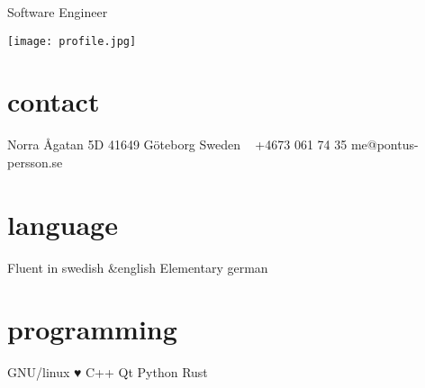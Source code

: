 \documentclass[]{friggeri-cv}
\begin{document}
       {Software Engineer}


\begin{aside}
	\texttt{[image: profile.jpg]}
  \section{contact}
    Norra Ågatan 5D
    41649 Göteborg
    Sweden
    ~
    +4673 061 74 35
    me@pontus-\nobreak persson.se
  \section{language}
	Fluent in swedish \&\nobreak english
    Elementary german
  \section{programming}
  GNU/linux ♥
  C++
  Qt
  Python
  Rust
  
\end{aside}

\end{document}

